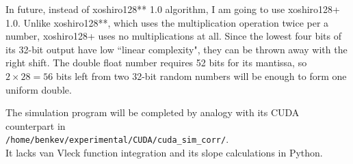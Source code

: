 \documentclass[preprint2]{aastex}
\begin{document}
In future, instead of xoshiro128** 1.0 algorithm, I am going to use xoshiro128+ 1.0. Unlike xoshiro128**, which uses the multiplication operation twice per a number, xoshiro128+ uses no multiplications at all. Since the lowest four bits of its 32-bit output have low ``linear complexity", they can be thrown away with the right shift. The double float number requires 52 bits for its mantissa, so $2\times 28 = 56$ bits left from two 32-bit random numbers will be enough to form one uniform double.

The simulation program will be completed by analogy with its CUDA counterpart in \\
\verb|/home/benkev/experimental/CUDA/cuda_sim_corr/|. \\
It lacks van Vleck function integration and its slope calculations in Python.
\end{document}
